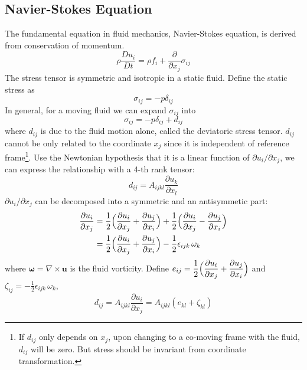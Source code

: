 \subsection{Navier-Stokes Equation}
The fundamental equation in fluid mechanics, Navier-Stokes equation,
is derived from conservation of momentum.
\begin{equation*}
    \rho\frac{D u_i}{D t} = \rho f_i + \frac{\partial}{\partial
    x_j}\sigma_{ij}
\end{equation*}
The stress tensor is symmetric and isotropic in a static fluid.
Define the static stress as
\begin{equation}\label{nav1}
    \sigma_{ij}=-p\delta_{ij}
\end{equation}
\newslide
In general, for a moving fluid we can expand $\sigma_{ij}$ into
\begin{equation}\label{nav2}
    \sigma_{ij}=-p\delta_{ij}+d_{ij}
\end{equation}
where $d_{ij}$ is due to the fluid motion alone, called the
deviatoric stress tensor. $d_{ij}$ cannot be only related to the
coordinate $x_j$ since it is independent of reference
frame\footnote{If $d_{ij}$ only depends on $x_j$, upon changing to a
co-moving frame with the fluid, $d_{ij}$ will be zero. But stress
should be invariant from coordinate transformation.}. Use the
Newtonian hypothesis that it is a linear function of $\partial
u_i/\partial x_j$, we can express the relationship with a 4-th rank
tensor:
\begin{equation}\label{nav3}
    d_{ij}=A_{ijkl}\frac{\partial u_k}{\partial x_l}
\end{equation}
\newslide
$\partial u_i/\partial x_j$ can be decomposed into a symmetric and
an antisymmetic part:
\begin{align*}
    \frac{\partial u_i}{\partial x_j}&=
    \frac{1}{2}\Bigl(\frac{\partial u_i}{\partial x_j}+\frac{\partial u_j}{\partial
    x_i}\Bigr)
    +\frac{1}{2}\Bigl(\frac{\partial u_i}{\partial
    x_j}-\frac{\partial u_j}{\partial
    x_i}\Bigr)\\
    &=\frac{1}{2}\Bigl(\frac{\partial u_i}{\partial x_j}+\frac{\partial u_j}{\partial
    x_i}\Bigr)
    -\frac{1}{2}\epsilon_{ijk}\,\omega_k
\end{align*}
where $\mathbf{\omega}=\nabla\times\mathbf{u}$ is the fluid
vorticity. Define $e_{ij}=\dfrac{1}{2}\Bigl(\dfrac{\partial
u_i}{\partial x_j}+\dfrac{\partial u_j}{\partial
    x_i}\Bigr)$ and
$\zeta_{ij}=-\frac{1}{2}\epsilon_{ijk}\,\omega_k$,
\begin{equation}\label{nav4}
    d_{ij}=A_{ijkl}\frac{\partial u_i}{\partial
    x_j}=A_{ijkl}(e_{kl}+\zeta_{kl})
\end{equation}
